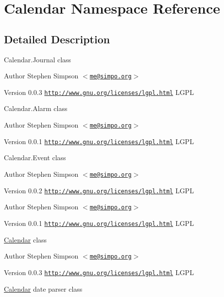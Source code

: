 \hypertarget{namespaceCalendar}{
\section{Calendar Namespace Reference}
\label{namespaceCalendar}
}


\subsection{Detailed Description}
Calendar.Journal class

\begin{DoxyAuthor}{Author}
Stephen Simpson $<$\href{mailto:me@simpo.org}{\tt me@simpo.org}$>$ 
\end{DoxyAuthor}
\begin{DoxyVersion}{Version}
0.0.3  \href{http://www.gnu.org/licenses/lgpl.html}{\tt http://www.gnu.org/licenses/lgpl.html} LGPL
\end{DoxyVersion}
Calendar.Alarm class

\begin{DoxyAuthor}{Author}
Stephen Simpson $<$\href{mailto:me@simpo.org}{\tt me@simpo.org}$>$ 
\end{DoxyAuthor}
\begin{DoxyVersion}{Version}
0.0.1  \href{http://www.gnu.org/licenses/lgpl.html}{\tt http://www.gnu.org/licenses/lgpl.html} LGPL
\end{DoxyVersion}
Calendar.Event class

\begin{DoxyAuthor}{Author}
Stephen Simpson $<$\href{mailto:me@simpo.org}{\tt me@simpo.org}$>$ 
\end{DoxyAuthor}
\begin{DoxyVersion}{Version}
0.0.2  \href{http://www.gnu.org/licenses/lgpl.html}{\tt http://www.gnu.org/licenses/lgpl.html} LGPL
\end{DoxyVersion}
\begin{DoxyAuthor}{Author}
Stephen Simpson $<$\href{mailto:me@simpo.org}{\tt me@simpo.org}$>$ 
\end{DoxyAuthor}
\begin{DoxyVersion}{Version}
0.0.1  \href{http://www.gnu.org/licenses/lgpl.html}{\tt http://www.gnu.org/licenses/lgpl.html} LGPL
\end{DoxyVersion}
\hyperlink{classCalendar}{Calendar} class

\begin{DoxyAuthor}{Author}
Stephen Simpson $<$\href{mailto:me@simpo.org}{\tt me@simpo.org}$>$ 
\end{DoxyAuthor}
\begin{DoxyVersion}{Version}
0.0.3  \href{http://www.gnu.org/licenses/lgpl.html}{\tt http://www.gnu.org/licenses/lgpl.html} LGPL
\end{DoxyVersion}
\hyperlink{classCalendar}{Calendar} date parser class

